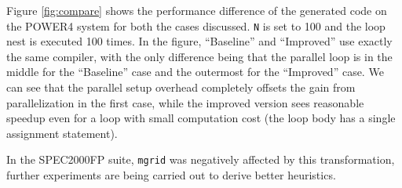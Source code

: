 Figure \ref{fig:compare} shows the performance difference of the
generated code on the POWER4 system for both the cases discussed. \texttt{N} is set to 100 and the loop nest is executed 100 times. In the figure, ``Baseline'' and
``Improved'' use exactly the same compiler, with the only difference being that the parallel loop
is in the middle for the ``Baseline'' case and the outermost for the ``Improved'' case. We can see that the parallel setup overhead completely offsets the gain from parallelization in the first case,
while the improved version sees reasonable speedup even for a loop with 
small computation cost (the loop body has a single assignment statement).

In the SPEC2000FP suite, \texttt{mgrid} was negatively affected by this
transformation, further experiments are being carried out to derive better heuristics.

